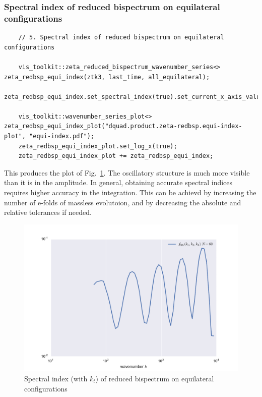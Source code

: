 \documentclass[11pt,a4paper]{article}
\begin{document}
\subsubsection{Spectral index of reduced bispectrum on equilateral configurations}
\begin{verbatim}
    // 5. Spectral index of reduced bispectrum on equilateral configurations

    vis_toolkit::zeta_reduced_bispectrum_wavenumber_series<> zeta_redbsp_equi_index(ztk3, last_time, all_equilateral);
    zeta_redbsp_equi_index.set_spectral_index(true).set_current_x_axis_value(vis_toolkit::axis_value::k);

    vis_toolkit::wavenumber_series_plot<> zeta_redbsp_equi_index_plot("dquad.product.zeta-redbsp.equi-index-plot", "equi-index.pdf");
    zeta_redbsp_equi_index_plot.set_log_x(true);
    zeta_redbsp_equi_index_plot += zeta_redbsp_equi_index;
\end{verbatim}
This produces the plot of Fig.~\ref{fig:equi-index-plot}.
The oscillatory structure is much more visible than it is in the amplitude.
In general, obtaining accurate spectral indices requires
higher accuracy in the integration.
This can be
achievd by increasing the number of e-folds of massless evolutoion,
and by decreasing the absolute and relative tolerances if needed.
\begin{figure}
    \begin{center}
        \includegraphics[scale=0.75]{Outputs/equi-index}
    \end{center}
    \caption{\label{fig:equi-index-plot}Spectral index (with $k_t$) of reduced bispectrum
    on equilateral configurations}
\end{figure}
\end{document}
